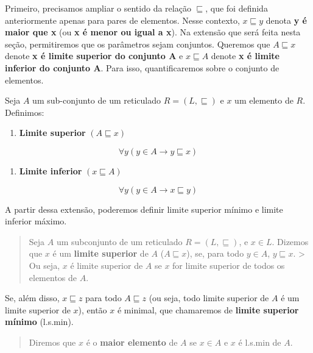 Primeiro, precisamos ampliar o sentido da relação \(\sqsubseteq\), que
foi definida anteriormente apenas para pares de elementos. Nesse
contexto, \(x \sqsubseteq y\) denota \textbf{y é maior que x} (ou
\textbf{x é menor ou igual a x}). Na extensão que será feita nesta
seção, permitiremos que os parâmetros sejam conjuntos. Queremos que
\(A \sqsubseteq x\) denote \textbf{x é limite superior do conjunto A} e
\(x \sqsubseteq A\) denote \textbf{x é limite inferior do conjunto A}.
Para isso, quantificaremos sobre o conjunto de elementos.

Seja \(A\) um sub-conjunto de um reticulado \(R = (L, \sqsubseteq)\) e
\(x\) um elemento de \(R\). Definimos:

\begin{enumerate}
\def\labelenumi{\arabic{enumi}.}
\tightlist
\item
  \textbf{Limite superior} \((A \sqsubseteq x)\)
\end{enumerate}

\[
\forall y (y \in A \rightarrow y \sqsubseteq x)
\]

\begin{enumerate}
\def\labelenumi{\arabic{enumi}.}
\setcounter{enumi}{1}
\tightlist
\item
  \textbf{Limite inferior} \((x \sqsubseteq A)\)
\end{enumerate}

\[
\forall y (y \in A \rightarrow x \sqsubseteq y)
\]

A partir dessa extensão, poderemos definir limite superior mínimo e
limite inferior máximo.

\begin{quote}
Seja \(A\) um subconjunto de um reticulado \(R = (L, \sqsubseteq)\), e
\(x \in L\). Dizemos que \(x\) é um \textbf{limite superior} de \(A\)
(\(A \sqsubseteq x\)), se, para todo \(y \in A\), \(y \sqsubseteq x\).
\textgreater{} Ou seja, \(x\) é limite superior de \(A\) se \(x\) for
limite superior de todos os elementos de \(A\).
\end{quote}

Se, além disso, \(x \sqsubseteq z\) para todo \(A \sqsubseteq z\) (ou
seja, todo limite superior de \(A\) é um limite superior de \(x\)),
então \(x\) é minimal, que chamaremos de \textbf{limite superior mínimo}
(l.s.min).

\begin{quote}
Diremos que \(x\) é o \textbf{maior elemento} de \(A\) se \(x \in A\) e
\(x\) é l.s.min de \(A\).
\end{quote}

